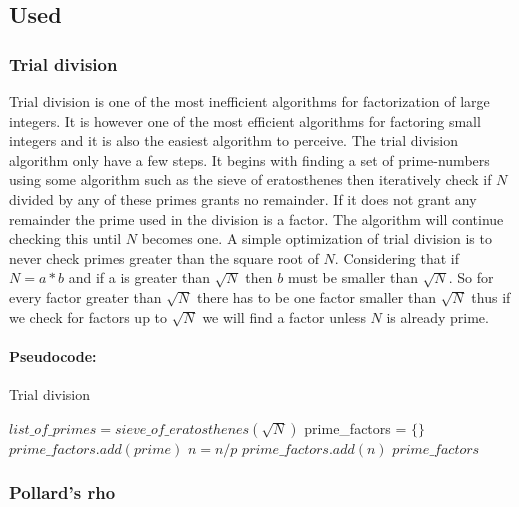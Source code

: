 \subsection{Used}

\subsubsection{Trial division}

Trial division is one of the most inefficient algorithms for factorization of large integers. It is however one of the most efficient algorithms for factoring small integers and it is also the easiest algorithm to perceive.
The trial division algorithm only have a few steps. It begins with finding a set of prime-numbers using some algorithm such as the sieve of eratosthenes then iteratively check if \(N\) divided by any of these primes grants no remainder. If it does not grant any remainder the prime used in the division is a factor. The algorithm will continue checking this until \(N\) becomes one.
A simple optimization of trial division is to never check primes greater than the square root of \(N\). Considering that if \(N = a * b\) and if a is greater than \(\sqrt{N}\) then \(b\) must be smaller than \(\sqrt{N}\). So for every factor greater than \(\sqrt{N}\) there has to be one factor smaller than \(\sqrt{N}\) thus if we check for factors up to \(\sqrt{N}\) we will find a factor unless \(N\) is already prime.


\paragraph{Pseudocode:}

\textcolor{white}{ }

\begin{algorithm}
\caption{Trial division}
\begin{algorithmic}
	 	\State \Return
	\EndIf
	\State $list\_of\_primes = sieve\_of\_eratosthenes(\sqrt{N})$
	\State prime\_factors = $\{\}$
			\State $prime\_factors.add(prime)$
			\State $n = n / p$
		\EndWhile
	\EndFor
		\State \Return $prime\_factors.add(n)$
	\EndIf
	\State \Return $prime\_factors$
	\EndFunction
	\end{algorithmic}
\end{algorithm}


\subsubsection{Pollard's rho}

